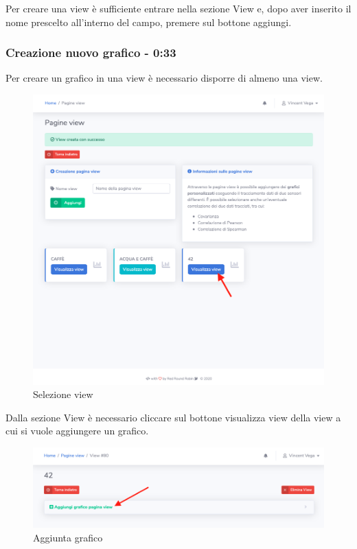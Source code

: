		Per creare una view è sufficiente entrare nella sezione View e, dopo aver inserito il nome prescelto all'interno del campo, premere sul bottone aggiungi.

	\subsubsection{Creazione nuovo grafico - 0:33}
		Per creare un grafico in una view è necessario disporre di almeno una view.
		\begin{figure}[H]
		\centering
		\includegraphics[scale=0.600]{res/images/membro/selView.png}
		\caption{Selezione view}
	\end{figure}
		Dalla sezione View è necessario cliccare sul bottone visualizza view della view a cui si vuole aggiungere un grafico.
		\begin{figure}[H]
		\centering
		\includegraphics[scale=0.600]{res/images/membro/clicAggGrafico.png}
		\caption{Aggiunta grafico}
	\end{figure}
